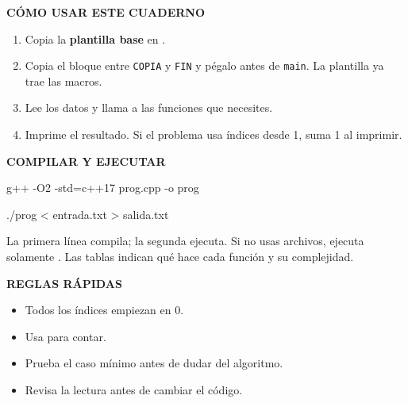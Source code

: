 \begin{minipage}[t]{0.315\linewidth}
{\sffamily\bfseries\small CÓMO USAR ESTE CUADERNO}\par\vspace{2pt}
\begin{enumerate}[leftmargin=1.25em,itemsep=0.8pt,topsep=0pt]
  \item Copia la \textbf{plantilla base} en .
  \item Copia el bloque entre \texttt{COPIA} y \texttt{FIN} y pégalo
        antes de \texttt{main}. La plantilla ya trae las macros.
  \item Lee los datos y llama a las funciones que necesites.
  \item Imprime el resultado. Si el problema usa índices desde 1,
        suma 1 al imprimir.
\end{enumerate}
\end{minipage}\hfill
\begin{minipage}[t]{0.315\linewidth}
{\sffamily\bfseries\small COMPILAR Y EJECUTAR}\par\vspace{2pt}
{\ttfamily\fontsize{6.7}{8.1}\selectfont
g++ -O2 -std=c++17 prog.cpp -o prog\par
./prog < entrada.txt > salida.txt\par}
\vspace{2pt}
{\footnotesize
La primera línea compila; la segunda ejecuta. Si no usas archivos, ejecuta
solamente . Las tablas indican qué hace cada función y su
complejidad.\par}
\end{minipage}\hfill
\begin{minipage}[t]{0.315\linewidth}
{\sffamily\bfseries\small REGLAS RÁPIDAS}\par\vspace{2pt}
\begin{itemize}[leftmargin=1.1em,itemsep=0.8pt,topsep=0pt]
  \item Todos los índices empiezan en 0.
  \item Usa  para contar.
  \item Prueba el caso mínimo antes de dudar del algoritmo.
  \item Revisa la lectura antes de cambiar el código.
\end{itemize}
\end{minipage}

